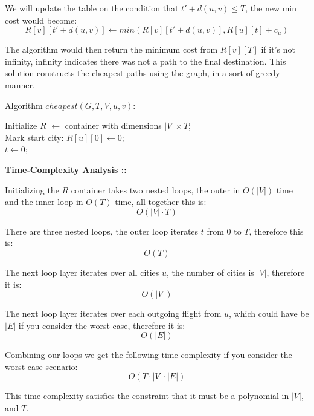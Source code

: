 \documentclass[11pt]{article}
\begin{document}
We will update the table on the condition that $t' + d(u, v) \le T$, the new min
cost would become:
$$R[v][t' + d(u, v)]\gets min(R[v][t'+d(u,v)], R[u][t] + c_u)$$

The algorithm would then return the minimum cost from $R[v][T]$ if it's not infinity,
infinity indicates there was not a path to the final destination. This solution constructs
the cheapest paths using the graph, in a sort of greedy manner.

\pagebreak

Algorithm $cheapest(G, T, V, u, v)$:

\begin{algorithm}
    Initialize $R$ $\gets$ container with dimensions $|V|\times T$; \\
    Mark start city: $R[u][0]\gets 0$; \\
    $t\gets 0$; \\
\end{algorithm}

\pagebreak

\textbf{Time-Complexity Analysis ::}

Initializing the $R$ container takes two nested loops, the outer in $O(|V|)$ time and
the inner loop in $O(T)$ time, all together this is:
$$O(|V|\cdot T)$$

There are three nested loops, the outer loop iterates $t$ from 0 to $T$, therefore this
is: $$O(T)$$

The next loop layer iterates over all cities $u$, the number of cities is $|V|$, therefore
it is: $$O(|V|)$$

The next loop layer iterates over each outgoing flight from $u$, which could have be
$|E|$ if you consider the worst case, therefore it is:
$$O(|E|)$$

Combining our loops we get the following time complexity if you consider the worst case
scenario:
$$O(T\cdot |V|\cdot |E|)$$

This time complexity satisfies the constraint that it must be a polynomial in $|V|$,
and $T$.
\end{document}
